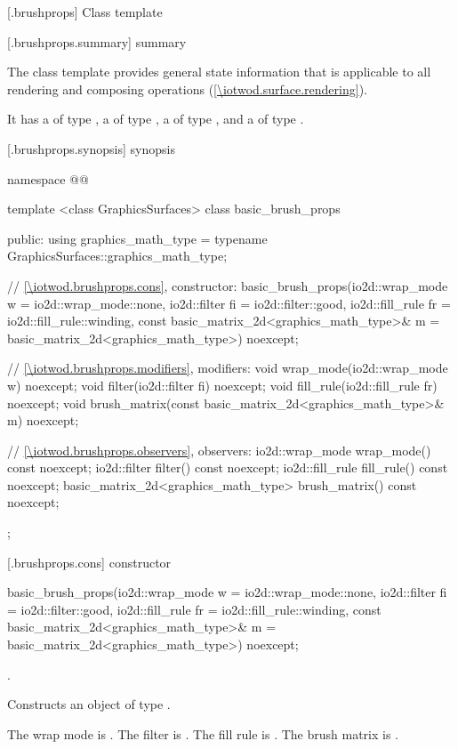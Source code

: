 
 [\iotwod.brushprops] {Class template }

 [\iotwod.brushprops.summary] { summary}

\pnum
{}%
The  class template provides general state information that is applicable to all rendering and composing operations (\ref{\iotwod.surface.rendering}).

\pnum
It has a  of type , a  of type , a  of type , and a  of type .

 [\iotwod.brushprops.synopsis] { synopsis}

\begin{codeblock}
namespace @\fullnamespace{}@ {
  template <class GraphicsSurfaces>
  class basic_brush_props {
    public:
    using graphics_math_type = typename GraphicsSurfaces::graphics_math_type;

    // \ref{\iotwod.brushprops.cons}, constructor:
    basic_brush_props(io2d::wrap_mode w = io2d::wrap_mode::none,
      io2d::filter fi = io2d::filter::good,
      io2d::fill_rule fr = io2d::fill_rule::winding,
      const basic_matrix_2d<graphics_math_type>& m = basic_matrix_2d<graphics_math_type>{})
      noexcept;

    // \ref{\iotwod.brushprops.modifiers}, modifiers:
    void wrap_mode(io2d::wrap_mode w) noexcept;
    void filter(io2d::filter fi) noexcept;
    void fill_rule(io2d::fill_rule fr) noexcept;
    void brush_matrix(const basic_matrix_2d<graphics_math_type>& m) noexcept;

    // \ref{\iotwod.brushprops.observers}, observers:
    io2d::wrap_mode wrap_mode() const noexcept;
    io2d::filter filter() const noexcept;
    io2d::fill_rule fill_rule() const noexcept;
    basic_matrix_2d<graphics_math_type> brush_matrix() const noexcept;
  };
}
\end{codeblock}

 [\iotwod.brushprops.cons] { constructor}

%
\begin{itemdecl}
basic_brush_props(io2d::wrap_mode w = io2d::wrap_mode::none,
  io2d::filter fi = io2d::filter::good,
  io2d::fill_rule fr = io2d::fill_rule::winding,
  const basic_matrix_2d<graphics_math_type>& m = basic_matrix_2d<graphics_math_type>{})
  noexcept;
\end{itemdecl}
\begin{itemdescr}
\pnum
\requires
{}.

\pnum
\effects
Constructs an object of type .

\pnum
The wrap mode is . The filter is . The fill rule is . The brush matrix is .
\end{itemdescr}

